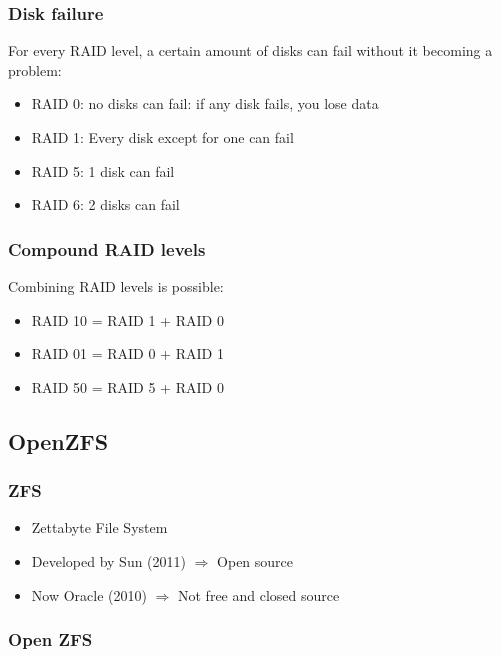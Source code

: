 \documentclass{article}
\begin{document}
\subsubsection{Disk failure}

For every RAID level, a certain amount of disks can fail without it becoming a problem:

\begin{itemize}
    \item RAID 0: no disks can fail: if any disk fails, you lose data
    \item RAID 1: Every disk except for one can fail
    \item RAID 5: 1 disk can fail
    \item RAID 6: 2 disks can fail
\end{itemize}

\subsubsection{Compound RAID levels}

Combining RAID levels is possible:

\begin{itemize}
    \item RAID 10 = RAID 1 + RAID 0
    \item RAID 01 = RAID 0 + RAID 1
    \item RAID 50 = RAID 5 + RAID 0
\end{itemize}

\subsection{OpenZFS}

\subsubsection{ZFS}

\begin{itemize}
    \item Zettabyte File System
    \item Developed by Sun (2011) $\Rightarrow$ Open source
    \item Now Oracle (2010) $\Rightarrow$ Not free and closed source
\end{itemize}

\subsubsection{Open ZFS}
\end{document}
